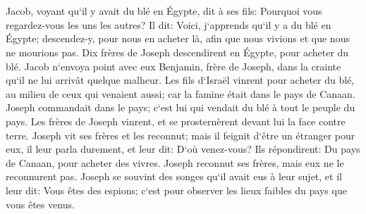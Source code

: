 \chapter{}

\verse Jacob, voyant qu`il y avait du blé en Égypte, dit à ses fils: Pourquoi vous regardez-vous les uns les autres? 
\verse Il dit: Voici, j`apprends qu`il y a du blé en Égypte; descendez-y, pour nous en acheter là, afin que nous vivions et que nous ne mourions pas. 
\verse Dix frères de Joseph descendirent en Égypte, pour acheter du blé. 
\verse Jacob n`envoya point avec eux Benjamin, frère de Joseph, dans la crainte qu`il ne lui arrivât quelque malheur. 
\verse Les fils d`Israël vinrent pour acheter du blé, au milieu de ceux qui venaient aussi; car la famine était dans le pays de Canaan. 
\verse Joseph commandait dans le pays; c`est lui qui vendait du blé à tout le peuple du pays. Les frères de Joseph vinrent, et se prosternèrent devant lui la face contre terre. 
\verse Joseph vit ses frères et les reconnut; mais il feignit d`être un étranger pour eux, il leur parla durement, et leur dit: D`où venez-vous? Ils répondirent: Du pays de Canaan, pour acheter des vivres. 
\verse Joseph reconnut ses frères, mais eux ne le reconnurent pas. 
\verse Joseph se souvint des songes qu`il avait eus à leur sujet, et il leur dit: Vous êtes des espions; c`est pour observer les lieux faibles du pays que vous êtes venus. 
